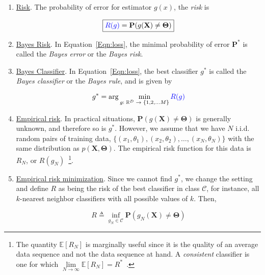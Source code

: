 \begin{enumerate}
\item \underline{Risk}.  The probability of error for estimator $g(x)$, the {\color{blue}\emph{risk}} is

\begin{equation}
\boxed{
{\color{blue}R(g)} = \mathbf{P}(g(\mathbf{X}) \neq \mathbf{\Theta})}
\label{Eqn:loss}
\end{equation}

\item \underline{Bayes Risk}. In Equation~\ref{Eqn:loss}, the minimal probability of error $\mathbf{P}^*$ is called the \emph{Bayes error} or the \emph{Bayes risk}.  

\item \underline{Bayes Classifier}.  In Equation~\ref{Eqn:loss}, the best classifier $g^*$ is called the \emph{Bayes classifier} or the \emph{Bayes rule}, and is given by

\begin{equation}
g^* = \arg\min_{\tiny g:~\mathbb{R}^D~\rightarrow~\{1, 2, \ldots M\}} {\color{blue}R(g)}
\end{equation}

\item \underline{Empirical risk}. In practical situations, $\mathbf{P}(g(\mathbf{X}) \neq \mathbf{\Theta})$ is generally unknown, and therefore so is $g^*$.  However, we assume that we have $N$ i.i.d. random pairs of training data, $\{(x_1, \theta_1), (x_2, \theta_2), \ldots, (x_N, \theta_N)\}$ with the same distribution as $p(\mathbf{X},\mathbf{\Theta})$.  The empirical risk function for this data is $R_N$, or $R(g_N)$~\footnote{The quantity $\mathbb{E}\left[R_N\right]$ is marginally useful since it is the quality of an average data sequence and not the data sequence at hand.  A \emph{consistent} classifier is one for which $\lim\limits_{N \rightarrow \infty}\mathbb{E}\left[R_N\right] = R^*$~\cite{1996_BOOK_PR_DevroyeGyorfiLugosi}.}.
  
\item \underline{Empirical risk minimization}.
Since we cannot find $g^*$, we change the setting and define $R$ as being the risk of the best classifier in class $\mathcal{C}$, for instance, all $k$-nearest neighbor classifiers with all possible values of $k$.  Then,

\begin{equation}
R \triangleq \inf\limits_{g_N \in \mathcal{C}} \mathbf{P}(g_N(\mathbf{X}) \neq \mathbf{\Theta})
\end{equation}


\end{enumerate}
